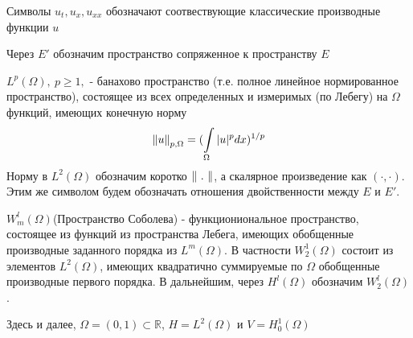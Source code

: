 
\Abbreviations

\begin{description}

    \item{Символы $u_t, u_x, u_{xx}$ обозначают соотвествующие классические
        производные функции $u$}

    \item{Через $E'$ обозначим пространство сопряженное к пространству $E$}

    \item{$L^{p}(\Omega), \ p \ge 1,$ - банахово пространство (т.е. полное линейное
нормированное пространство), состоящее из всех определенных и измеримых (по
Лебегу) на $\Omega$ функций, имеющих конечную норму
\begin{equation*}
    \left\lVert u\right\rVert_{p, \Omega} = (\int\limits_{\Omega}{|u|^p dx})^{1/p}
\end{equation*}
Норму в $L^2(\Omega)$ обозначим коротко $\left\lVert\ .\ \right\rVert$, а скалярное произведение
как $(\cdot,\cdot)$. Этим же символом будем обозначать отношения двойственности
между $E$ и $E'$.}\cite{OAL}

\item{$W^l_m(\Omega)$(Пространство Соболева) - функциониональное пространство,
состоящее из функций из пространства Лебега, имеющих обобщенные производные 
заданного порядка из $L^m(\Omega)$. В частности
$W^1_2(\Omega)$ состоит из элементов $L^2(\Omega)$, имеющих квадратично
суммируемые по $\Omega$ обобщенные производные первого порядка. В дальнейшим,
через $H^l(\Omega)$ обозначим $W^l_2(\Omega)$.}

\item{Здесь и далее, $\Omega = (0, 1) \subset \mathbb{R}$, $H = L^2(\Omega)$ и 
    $V = H^1_0(\Omega)$}

\end{description}


